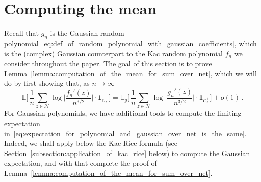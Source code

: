 \documentclass[11pt]{amsart}
\theoremstyle{remark}
\theoremstyle{definition}
\newcommand{\bE}{\mathbb E}
\newcommand{\cC}{\mathcal C}
\newcommand{\cN}{\mathcal N}
\newcommand{\one}{\boldsymbol{1}}
\begin{document}
    \section{Computing the mean}
    \label{sec:computing_the_mean}
    \noindent
    Recall that $g_n$ is the Gaussian random polynomial~\eqref{eq:def_of_random_polynomial_with_gaussian_coefficients}, which is the (complex) Gaussian counterpart to the Kac random polynomial $f_n$ we consider throughout the paper. The goal of this section is to prove Lemma~\ref{lemma:computation_of_the_mean_for_sum_over_net}, which we will do by first showing that, as $n\to \infty$
    \begin{equation}
    \label{eq:expectation_for_polynomial_and_gaussian_over_net_is_the_same}
        \bE\bigg[ \,  \frac{1}{n} \sum_{z \in \cN} \log \Big|\frac{f_n'(z)}{n^{3/2}} \Big| \cdot \one_{\cC_z^+} \bigg] = \bE_g\bigg[ \,  \frac{1}{n} \sum_{z \in \cN} \log \Big|\frac{g_n'(z)}{n^{3/2}} \Big| \cdot \one_{\cC_z^+} \bigg] + o(1) \, .
    \end{equation}
    For Gaussian polynomials, we have additional tools to compute the limiting expectation in~\eqref{eq:expectation_for_polynomial_and_gaussian_over_net_is_the_same}. Indeed, we shall apply below the Kac-Rice formula (see Section~\ref{subsection:application_of_kac_rice} below) to compute the Gaussian expectation, and with that complete the proof of Lemma~\ref{lemma:computation_of_the_mean_for_sum_over_net}. 
   
\end{document}
